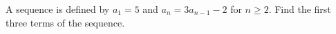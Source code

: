A sequence is defined by $a_1=5$ and $a_n=3a_{n-1}-2$ for $n\ge2$. Find the first three terms of the sequence.
